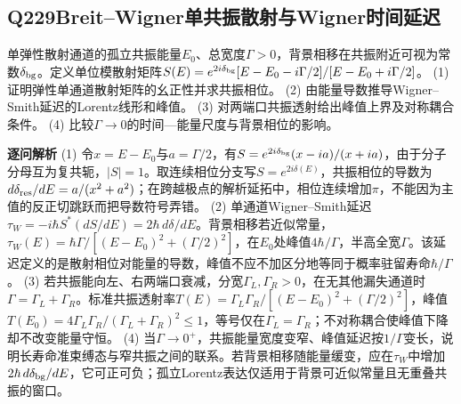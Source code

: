 \subsection*{Q229\quad Breit–Wigner单共振散射与Wigner时间延迟}
单弹性散射通道的孤立共振能量$E_0$、总宽度$\Gamma>0$，背景相移在共振附近可视为常数$\delta_{\rm bg}$。定义单位模散射矩阵$S(E)=e^{2i\delta_{\rm bg}}[E-E_0-i\Gamma/2]/[E-E_0+i\Gamma/2]$。
(1) 证明弹性单通道散射矩阵的幺正性并求共振相位。
(2) 由能量导数推导Wigner–Smith延迟的Lorentz线形和峰值。
(3) 对两端口共振透射给出峰值上界及对称耦合条件。
(4) 比较$\Gamma\to0$的时间—能量尺度与背景相位的影响。
\par\textbf{逐问解析}
(1) 令$x=E-E_0$与$a=\Gamma/2$，有$S=e^{2i\delta_{\rm bg}}(x-ia)/(x+ia)$，由于分子分母互为复共轭，$|S|=1$。取连续相位分支写$S=e^{2i\delta(E)}$，共振相位的导数为$d\delta_{\rm res}/dE=a/(x^2+a^2)$；在跨越极点的解析延拓中，相位连续增加$\pi$，不能因为主值的反正切跳跃而把导数符号弄错。
(2) 单通道Wigner–Smith延迟$\tau_W=-i\hbar S^*(dS/dE)=2\hbar\,d\delta/dE$。背景相移若近似常量，$\tau_W(E)=\hbar\Gamma/[(E-E_0)^2+(\Gamma/2)^2]$，在$E_0$处峰值$4\hbar/\Gamma$，半高全宽$\Gamma$。该延迟定义的是散射相位对能量的导数，峰值不应不加区分地等同于概率驻留寿命$\hbar/\Gamma$。
(3) 若共振能向左、右两端口衰减，分宽$\Gamma_L,\Gamma_R>0$，在无其他漏失通道时$\Gamma=\Gamma_L+\Gamma_R$。标准共振透射率$T(E)=\Gamma_L\Gamma_R/[(E-E_0)^2+(\Gamma/2)^2]$，峰值$T(E_0)=4\Gamma_L\Gamma_R/(\Gamma_L+\Gamma_R)^2\le1$，等号仅在$\Gamma_L=\Gamma_R$；不对称耦合使峰值下降却不改变能量守恒。
(4) 当$\Gamma\to0^+$，共振能量宽度变窄、峰值延迟按$1/\Gamma$变长，说明长寿命准束缚态与窄共振之间的联系。若背景相移随能量缓变，应在$\tau_W$中增加$2\hbar\,d\delta_{\rm bg}/dE$，它可正可负；孤立Lorentz表达仅适用于背景可近似常量且无重叠共振的窗口。
\par\medskip
